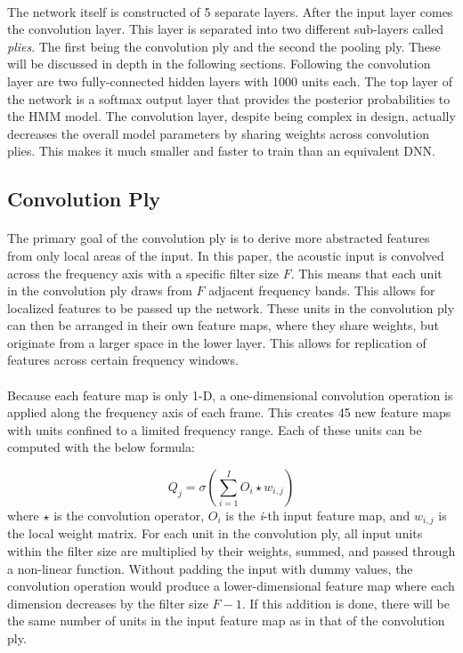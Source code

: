 \documentclass[letterpaper]{article}
\begin{document}
\paragraph{} The network itself is constructed of 5 separate layers. After the input layer comes the convolution layer. This layer is separated into two different sub-layers called \textit{plies}. The first being the convolution ply and the second the pooling ply. These will be discussed in depth in the following sections. Following the convolution layer are two fully-connected hidden layers with 1000 units each. The top layer of the network is a softmax output layer that provides the posterior probabilities to the HMM model. The convolution layer, despite being complex in design, actually decreases the overall model parameters by sharing weights across convolution plies. This makes it much smaller and faster to train than an equivalent DNN.

\subsection*{Convolution Ply}

\paragraph{} The primary goal of the convolution ply is to derive more abstracted features from only local areas of the input. In this paper, the acoustic input is convolved across the frequency axis with a specific filter size $F$. This means that each unit in the convolution ply draws from $F$ adjacent frequency bands. This allows for localized features to be passed up the network. These units in the convolution ply can then be arranged in their own feature maps, where they share weights, but originate from a larger space in the lower layer. This allows for replication of features across certain frequency windows.

\paragraph{} Because each feature map is only 1-D, a one-dimensional convolution operation is applied along the frequency axis of each frame. This creates 45 new feature maps with units confined to a limited frequency range. Each of these units can be computed with the below formula:

\begin{equation*}
	Q_{j} = \sigma \left(\sum_{i=1}^{I}O_{i}\star w_{i,j}\right)
\end{equation*}
where $\star$ is the convolution operator, $O_{i}$ is the \textit{i}-th input feature map, and $w_{i,j}$ is the local weight matrix. For each unit in the convolution ply, all input units within the filter size are multiplied by their weights, summed, and passed through a non-linear function. Without padding the input with dummy values, the convolution operation would produce a lower-dimensional feature map where each dimension decreases by the filter size $F-1$. If this addition is done, there will be the same number of units in the input feature map as in that of the convolution ply.
\end{document}
